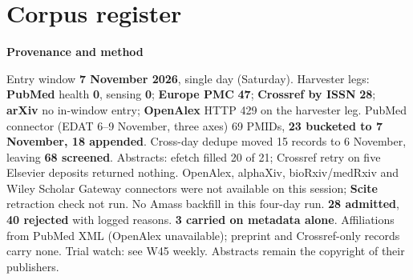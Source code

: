 \documentclass[10pt]{article}
\begin{document}
\clearpage
\section*{\sffamily\bfseries\color{Deep}Corpus register}
\vspace{-1.5mm}{\color{Amber}\rule{\linewidth}{1.1pt}}\vspace{2.5mm}



\vspace{2mm}

\begin{keybox}
{\sffamily\bfseries\footnotesize\color{Deep}Provenance and method}\\[1.2mm]
{\fontsize{7.2}{8.8}\selectfont
Entry window \textbf{7 November 2026}, single day (Saturday). Harvester legs: \textbf{PubMed} health \textbf{0}, sensing \textbf{0}; \textbf{Europe PMC} \textbf{47}; \textbf{Crossref by ISSN} \textbf{28}; \textbf{arXiv} no in-window entry; \textbf{OpenAlex} HTTP 429 on the harvester leg. PubMed connector (EDAT 6--9 November, three axes) 69 PMIDs, \textbf{23 bucketed to 7 November, 18 appended}. Cross-day dedupe moved 15 records to 6 November, leaving \textbf{68 screened}. Abstracts: efetch filled 20 of 21; Crossref retry on five Elsevier deposits returned nothing.
OpenAlex, alphaXiv, bioRxiv/medRxiv and Wiley Scholar Gateway connectors were not available on this session; \textbf{Scite} retraction check not run. No Amass backfill in this four-day run.
\textbf{28 admitted}, \textbf{40 rejected} with logged reasons. \textbf{3 carried on metadata alone}. Affiliations from PubMed XML (OpenAlex unavailable); preprint and Crossref-only records carry none. Trial watch: see W45 weekly.
Abstracts remain the copyright of their publishers.\par}
\end{keybox}
\end{document}
